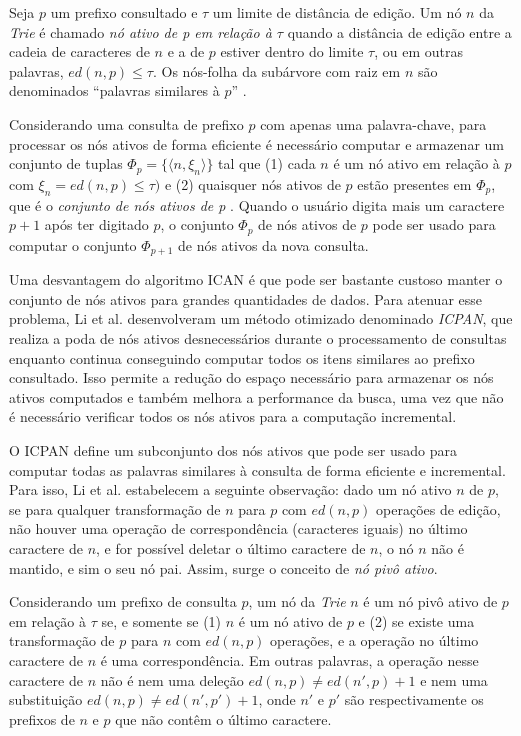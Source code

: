 Seja $p$ um prefixo consultado e $\tau$ um limite de distância de edição. Um nó $n$ da \textit{Trie} é chamado \textit{nó ativo de p em relação à $\tau$} quando a distância de edição entre a cadeia de caracteres de $n$ e a de $p$ estiver dentro do limite $\tau$, ou em outras palavras, $ed(n, p) \leq \tau$. Os nós-folha da subárvore com raiz em $n$ são denominados ``palavras similares à $p$'' \citep{ji2009efficient}. 

Considerando uma consulta de prefixo $p$ com apenas uma palavra-chave, para processar os nós ativos de forma eficiente é necessário computar e armazenar um conjunto de tuplas $\Phi_{p} = \{ \langle n, \xi_{n} \rangle \}$ tal que (1) cada $n$ é um nó ativo em relação à $p$ com $\xi_{n} = ed(n, p) \leq \tau)$ e (2) quaisquer nós ativos de $p$ estão presentes em $\Phi_{p}$, que é o \textit{conjunto de nós ativos de p} \citep{ji2009efficient}. Quando o usuário digita mais um caractere $p + 1$ após ter digitado $p$, o conjunto $\Phi_{p}$ de nós ativos de $p$ pode ser usado para computar o conjunto $\Phi_{p + 1}$ de nós ativos da nova consulta.

Uma desvantagem do algoritmo ICAN é que pode ser bastante custoso manter o conjunto de nós ativos para grandes quantidades de dados. Para atenuar esse problema, Li et al. \citep{li2011efficient} desenvolveram um método otimizado denominado \textit{ICPAN}, que realiza a poda de nós ativos desnecessários durante o processamento de consultas enquanto continua conseguindo computar todos os itens similares ao prefixo consultado. Isso permite a redução do espaço necessário para armazenar os nós ativos computados e também melhora a performance da busca, uma vez que não é necessário verificar todos os nós ativos para a computação incremental.

O ICPAN define um subconjunto dos nós ativos que pode ser usado para computar todas as palavras similares à consulta de forma eficiente e incremental. Para isso, Li et al. \citep{li2011efficient} estabelecem a seguinte observação: dado um nó ativo $n$ de $p$, se para qualquer transformação de $n$ para $p$ com $ed(n,p)$ operações de edição, não houver uma operação de correspondência (caracteres iguais) no último caractere de $n$, e for possível deletar o último caractere de $n$, o nó $n$ não é mantido, e sim o seu nó pai. Assim, surge o conceito de \textit{nó pivô ativo}.

Considerando um prefixo de consulta $p$, um nó da \textit{Trie} $n$ é um nó pivô ativo de $p$ em relação à $\tau$ se, e somente se (1) $n$ é um nó ativo de $p$ e (2) se existe uma transformação de $p$ para $n$ com $ed(n,p)$ operações, e a operação no último caractere de $n$ é uma correspondência. Em outras palavras, a operação nesse caractere de $n$ não é nem uma deleção $ed(n,p) \neq ed(n',p) + 1$ e nem uma substituição $ed(n,p) \neq ed(n', p') + 1$, onde $n'$ e $p'$ são respectivamente os prefixos de $n$ e $p$ que não contêm o último caractere.

